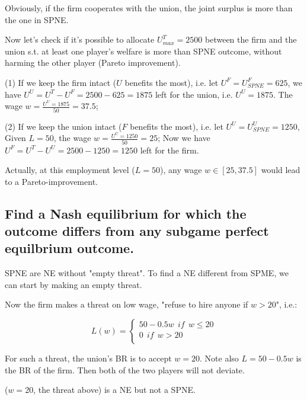 \documentclass{article}
\begin{document}
\begin{mdframed}[backgroundcolor=blue!20,linecolor=white]

Obviously, if the firm cooperates with the union, the joint surplus is more than the one in SPNE.

\medskip

Now let's check if it's possible to allocate $U^T_{max} = 2500$ between the firm and the union s.t. at least one player's welfare is more than SPNE outcome, without harming the other player (Pareto improvement).

\end{mdframed}

\medskip

(1) If we keep the firm intact ($U$ benefits the most), i.e. let $U^F = U^F_{SPNE} = 625$,
we have $U^U=U^T-U^F = 2500-625 = 1875$ left for the union, i.e. $U^U = 1875$.
The wage $w= \frac{U^U = 1875}{50}=37.5$;

\medskip

(2) If we keep the union intact ($F$ benefits the most), i.e. let $U^U = U^U_{SPNE} = 1250$,
Given $L = 50$, the wage $w= \frac{U^U = 1250}{50}=25$; Now
we have $U^F =U^T-U^U = 2500-1250 = 1250$ left for the firm.

\medskip

Actually, at this employment level ($L=50$), any wage $w \in [25,37.5]$ would lead to a Pareto-improvement. 
%
\subsection{Find a Nash equilibrium for which the outcome differs from any subgame perfect
equilbrium outcome.}

\begin{mdframed}[backgroundcolor=blue!20,linecolor=white]
SPNE are NE without "empty threat". To find a NE different from SPME, we can start by making an empty threat.

\end{mdframed}

Now the firm makes a threat on low wage, "refuse to hire anyone if $w > 20$", i.e.:

\begin{equation}
L(w)=
    \begin{cases}
    50-0.5w \ \ if \ \ w \le 20 \\
    0 \ \ if \ \ w > 20 \\
    \end{cases}
    \label{eq:threat}   
\end{equation}

For such a threat, the union's BR is to accept $w=20$. 
Note also $L = 50-0.5w$ is the BR of the firm. Then both of the two players will not deviate.

($w=20$, the threat above) is a NE but not a SPNE.
\end{document}
